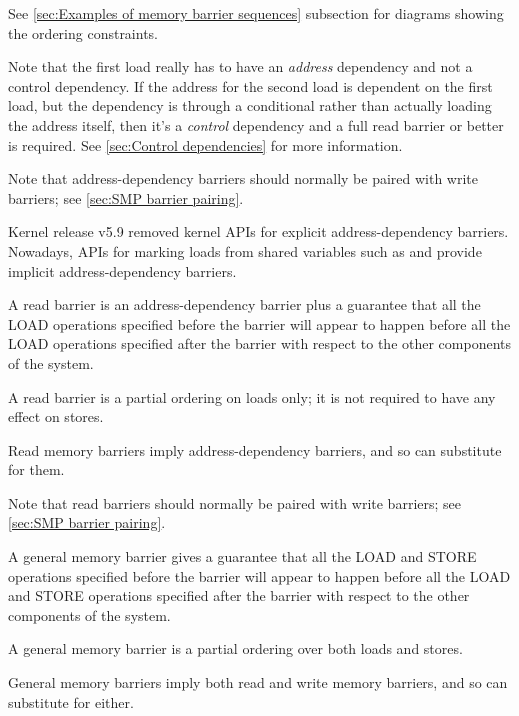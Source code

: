 \begin{description}[style=nextline]
     See \cref{sec:Examples of memory barrier sequences} subsection for diagrams
     showing the ordering constraints.

     \begin{Note}
     Note that the first load really has to have an \emph{address}
     dependency and not a control dependency.
     If the address for the second load is dependent on the first load,
     but the dependency is through a conditional rather than actually
     loading the address itself, then it's a \emph{control} dependency and
     a full read barrier or better is required.
     See \cref{sec:Control dependencies} for more information.
     \end{Note}

     \begin{Note}
     Note that address-dependency barriers should normally be paired with
     write barriers; see \cref{sec:SMP barrier pairing}.
     \end{Note}

     \begin{Note}
     Kernel release v5.9 removed kernel APIs for explicit
     address-dependency barriers.
     Nowadays, APIs for marking loads from shared variables such as
      and  provide implicit
     address-dependency barriers.
     \end{Note}

 \item[Read (or load) memory barriers:]
     A read barrier is an address-dependency barrier plus a guarantee that all
     the LOAD operations specified before the barrier will appear to happen
     before all the LOAD operations specified after the barrier with respect to
     the other components of the system.

     A read barrier is a partial ordering on loads only; it is not required to
     have any effect on stores.

     Read memory barriers imply address-dependency barriers, and so can
     substitute for them.

     \begin{Note}
     Note that read barriers should normally be paired with write barriers;
     see \cref{sec:SMP barrier pairing}.
     \end{Note}

 \item[General memory barriers:]
     A general memory barrier gives a guarantee that all the LOAD and STORE
     operations specified before the barrier will appear to happen before all
     the LOAD and STORE operations specified after the barrier with respect to
     the other components of the system.

     A general memory barrier is a partial ordering over both loads and stores.

     General memory barriers imply both read and write memory barriers, and so
     can substitute for either.
\end{description}

